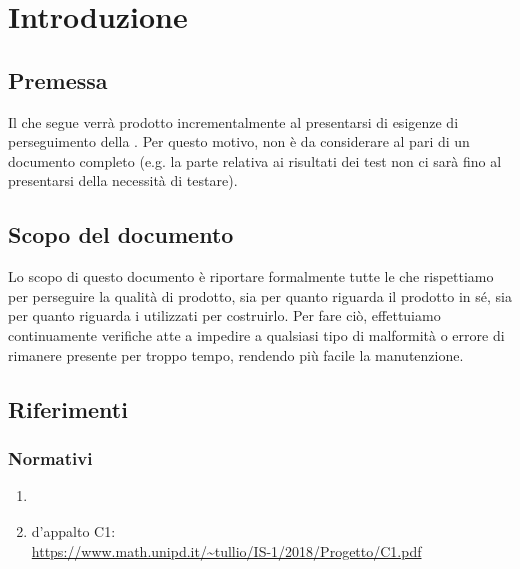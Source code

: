 \section{Introduzione}\label{introduzione}

    

    \subsection{Premessa}
    Il  che segue verrà prodotto incrementalmente al presentarsi di esigenze di perseguimento della .
    Per questo motivo, non è da considerare al pari di un documento completo (e.g. la parte relativa ai risultati dei test non ci sarà fino
    al presentarsi della necessità di testare).

    \subsection{Scopo del documento}
    Lo scopo di questo documento è riportare formalmente tutte le  che rispettiamo per perseguire
    la qualità di prodotto, sia per quanto riguarda il prodotto in s\'e, sia per quanto riguarda i 
    utilizzati per costruirlo. Per fare ciò, effettuiamo continuamente verifiche atte a impedire a qualsiasi tipo di malformità o errore di rimanere presente per troppo tempo, rendendo più facile la manutenzione.

    

    \subsection{Riferimenti}

	\subsubsection{Normativi}
    \begin{enumerate}
    	\item \textit{\NdPv}
    	\item {} d'appalto C1:\\ \url{https://www.math.unipd.it/~tullio/IS-1/2018/Progetto/C1.pdf}

    \end{enumerate}

